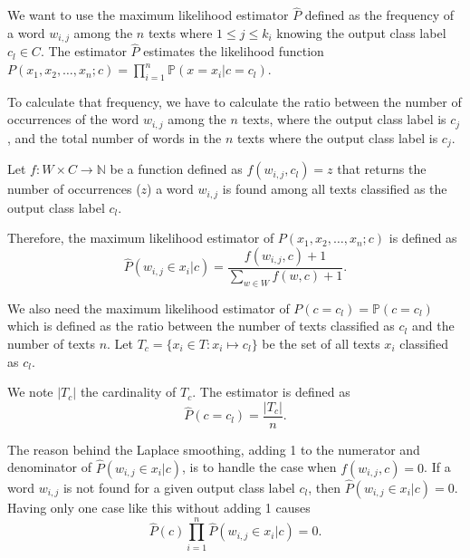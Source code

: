 \documentclass{article}
\begin{document}
We want to use the maximum likelihood estimator $\widehat{P}$ defined as the frequency of a word $w_{i,j}$ among the $n$ texts where $1 \leq j \leq k_i$ knowing the output class label $c_l \in C$. The estimator $\widehat{P}$ estimates the likelihood function $P(x_1,x_2,\ldots,x_n ; c) = \prod\limits_{i=1}^n \mathbb{P}(x = x_i | c = c_l)$.

To calculate that frequency, we have to calculate the ratio between the number of occurrences of the word $w_{i,j}$ among the $n$ texts, where the output class label is $c_j$, and the total number of words in the $n$ texts where the output class label is $c_j$.

Let $f : W \times C \longrightarrow \mathbb{N}$ be a function defined as $f(w_{i,j}, c_l) = z$ that returns the number of occurrences ($z$) a word $w_{i,j}$ is found among all texts classified as the output class label $c_l$.

Therefore, the maximum likelihood estimator of $P(x_1,x_2,\ldots,x_n ; c)$ is defined as
\begin{equation} \label{eq:LikelihoodEstimatorWords}
	\widehat{P}(w_{i,j} \in x_i | c) = \frac{f(w_{i,j}, c) + 1}{\sum\limits_{w \in W} f(w, c) + 1}.
\end{equation}

We also need the maximum likelihood estimator of $P(c = c_l) = \mathbb{P}(c = c_l)$ which is defined as the ratio between the number of texts classified as $c_l$ and the number of texts $n$. Let $T_c = \{x_i \in T : x_i \mapsto c_l\}$ be the set of all texts $x_i$ classified as $c_l$. 

We note $|T_c|$ the cardinality of $T_c$. The estimator is defined as
\begin{equation}
	\widehat{P}(c = c_l) = \frac{|T_c|}{n}.
\end{equation}

The reason behind the Laplace smoothing, adding 1 to the numerator and denominator of $\widehat{P}(w_{i,j} \in x_i | c)$, is to handle the case when $f(w_{i,j}, c) = 0$. If a word $w_{i,j}$ is not found for a given output class label $c_l$, then $\widehat{P}(w_{i,j} \in x_i | c) = 0$. Having only one case like this without adding 1 causes 
\begin{equation}
	\widehat{P}(c) \prod\limits_{i=1}^n \widehat{P}(w_{i,j} \in x_i | c) = 0.
\end{equation}
\end{document}
